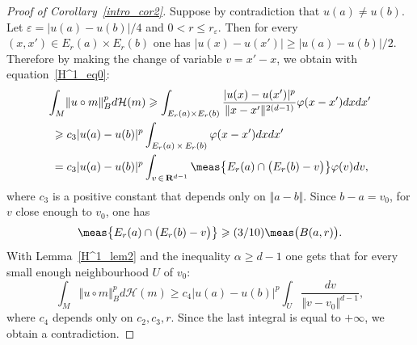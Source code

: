 \begin{proof}[Proof of Corollary~\ref{intro_cor2}]
Suppose by contradiction that $u(a) \neq u(b)$. Let $\varepsilon = \vert u(a) - u(b) \vert /4$ and $0<r \leqslant r_\varepsilon$. Then for every $(x,x') \in E_r (a) \times E_r (b)$ one has $\vert u(x) - u(x') \vert \geqslant \vert u(a) - u(b) \vert /2$. Therefore by making the change of variable $v = x' -x$, we obtain with equation~\ref{H^1_eq0}:
\begin{multline*}
\int _M \!\Vert u \circ m \Vert _B ^p d\mathcal H (m) \geqslant
\int _{E_r (a) \times E_r (b)} \frac{\vert u(x) - u(x') \vert ^p}{\Vert x-x' \Vert ^{2(d-1)}}
\varphi (x-x') dxdx'\\
\begin{aligned}
&\geqslant c_3 \vert u(a) - u(b) \vert ^p \int _{E_r (a)\,\times\,E_r (b)} \varphi (x-x') dxdx'\\
&= c_3 \vert u(a) - u(b) \vert ^p \int _{v \,\in\,{\bf R} ^{d-1}} \meas\bigl\{E_r (a) \cap \bigl(E_r (b) -v \bigr)\bigr\}
\varphi (v) dv,
\end{aligned}
\end{multline*}
where $c_3$ is a positive constant that depends only on $\Vert a - b \Vert$. Since $b-a = v_0$, for $v$ close enough to $v_0$, one has
\[
\meas\bigl\{E_r (a) \cap \bigl(E_r (b) -v\bigr)\bigr\} \geqslant (3/10) \meas\bigl(B(a, r)\bigr).
\]
With Lemma~\ref{H^1_lem2} and the inequality $\alpha \geqslant d-1$ one gets that for every small enough neighbourhood $U$ of $v_0$:
\[
\int _M \!\Vert u \circ m \Vert _B ^p d\mathcal H (m) \geqslant
c_4 \vert u(a) - u(b) \vert ^p \int _{U} \frac{dv}{\Vert v-v_0 \Vert ^{d-1}},
\]
where $c_4$ depends only on $c_2, c_3, r$. Since the last integral is equal to $+\infty$, we obtain a contradiction.
\end{proof}



